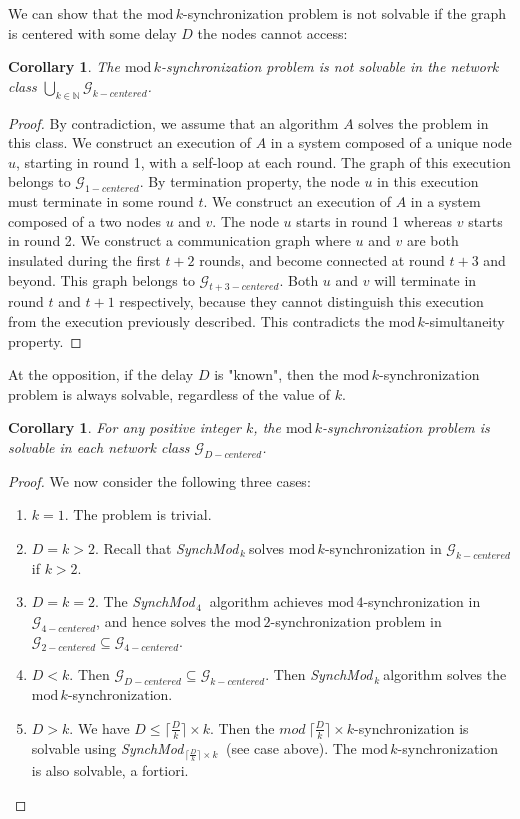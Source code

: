 \documentclass[11pt,letterpaper]{article}
\newtheorem{cor}[thm]{Corollary}
\newcommand{\SM}{{\em SynchMod}$_{\,k}\ $}
\begin{document}
We can show that the $\mathrm{mod}\,k$-synchronization problem is not solvable if the graph is centered with some delay $D$ the nodes cannot access:

\begin{cor}
	The $\mathrm{mod}\,k$-synchronization problem is not solvable in the network class $\underset{k \in \mathds{N}}{\bigcup} \mathcal{G}_{k-centered}$.
\end{cor}
\begin{proof}
	By contradiction, we assume that an algorithm $A$ solves the problem in this class.
	We construct an execution of $A$ in a system composed of a unique node $u$, starting in round 1, with a self-loop at each round.
	The graph of this execution belongs to $\mathcal{G}_{1-centered}$.
	By termination property, the node $u$ in this execution must terminate in some round $t$.
	We construct an execution of $A$ in a system composed of a two nodes $u$ and $v$. The node $u$ starts in round 1 whereas $v$ starts in round 2.
	We construct a communication graph where $u$ and $v$ are both insulated during the first $t+2$ rounds, and become connected at round $t+3$ and beyond.
	This graph belongs to $\mathcal{G}_{t+3-centered}$.
	Both $u$ and $v$ will terminate in round $t$ and $t+1$ respectively, because they cannot distinguish this execution from the execution previously described.
	This contradicts the $\mathrm{mod}\,k$-simultaneity property.
\end{proof}

At the opposition, if the delay $D$ is "known", then the $\mathrm{mod}\,k$-synchronization problem is always solvable, regardless of the value of $k$.

\begin{cor}
	For any positive integer $k$, the $\mathrm{mod}\,k$-synchronization problem is solvable in each network class $\mathcal{G}_{D-centered}$.
\end{cor}
\begin{proof}
	We now consider the following three cases:
	\begin{enumerate}
		\item $k = 1$. The problem is trivial.
		\item $D = k > 2$. Recall that \SM solves $\mathrm{mod}\,k$-synchronization in $\mathcal{G}_{k-centered}$ if $k > 2$.
		\item $D = k = 2$. The {\em SynchMod}$_{\,4}\ $ algorithm achieves $\mathrm{mod}\,4$-synchronization in $\mathcal{G}_{4-centered}$,
			and hence solves the $\mathrm{mod}\,2$-synchronization problem in $\mathcal{G}_{2-centered} \subseteq \mathcal{G}_{4-centered}$.
		\item $D < k$. Then $\mathcal{G}_{D-centered} \subseteq \mathcal{G}_{k-centered}$.
			Then \SM algorithm solves the $\mathrm{mod}\,k$-synchronization.
		\item $D > k$. We have $D \leq \lceil \frac{D}{k} \rceil \times k$.
			Then the $mod~\lceil \frac{D}{k} \rceil \times k$-synchronization is solvable using {\em SynchMod}$_{\,\lceil \frac{D}{k} \rceil \times k}\ $ (see case above).
			The $\mathrm{mod}\,k$-synchronization is also solvable, a fortiori.
	\end{enumerate}

\end{proof}
\end{document}
